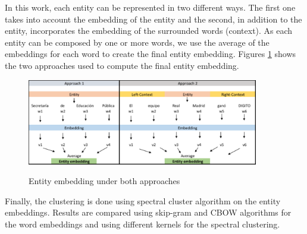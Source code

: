 \documentclass[]{article}
\begin{document}
	
	In this work, each entity can be represented in two different ways. The first one takes into account the embedding of the entity and the second, in addition to the entity, incorporates the embedding of the surrounded words (context). As each entity can be composed by one or more words, we use the average of the embeddings for each word to create the final entity embedding. Figures \ref{fig:gull} shows the two approaches used to compute the final entity embedding.  
	
	

	\begin{figure}[h]
		\caption{Entity embedding under both approaches }
		\centering
		\includegraphics[width=0.9\textwidth]{Figures/EntityEmb}
		\label{fig:gull}
	\end{figure}
	
	Finally, the clustering is done using spectral cluster algorithm on the entity embeddings. Results are compared using skip-gram and CBOW algorithms for the word embeddings and using different kernels for the spectral clustering. 
	
	
	
\end{document}
